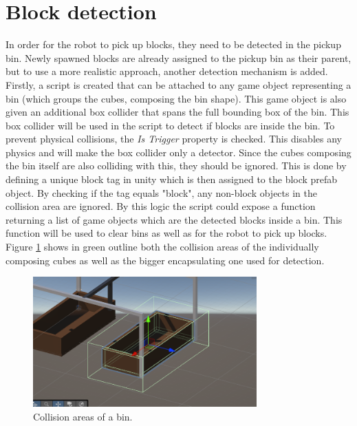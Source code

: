 \documentclass{report}
\begin{document}
\section{Block detection}

In order for the robot to pick up blocks, they need to be detected in the pickup bin. Newly spawned blocks are already assigned to the pickup bin as their parent, but to use a more realistic approach, another detection mechanism is added.
Firstly, a script is created that can be attached to any game object representing a bin (which groups the cubes, composing the bin shape).
This game object is also given an additional box collider that spans the full bounding box of the bin. This box collider will be used in the script to detect if blocks are inside the bin. To prevent physical collisions, the \textit{Is Trigger} property is checked. This disables any physics and will make the box collider only a detector. Since the cubes composing the bin itself are also colliding with this, they should be ignored. This is done by defining a unique block tag in unity which is then assigned to the block prefab object. By checking if the tag equals "block", any non-block objects in the collision area are ignored. By this logic the script could expose a function returning a list of game objects which are the detected blocks inside a bin. This function will be used to clear bins as well as for the robot to pick up blocks. Figure \ref{fig:coll} shows in green outline both the collision areas of the individually composing cubes as well as the bigger encapsulating one used for detection.

\begin{figure}[H]
\centering
\includegraphics[height=50mm, keepaspectratio]{report_images/coll.png}
\caption{Collision areas of a bin.}
\label{fig:coll}
\end{figure}
\end{document}

